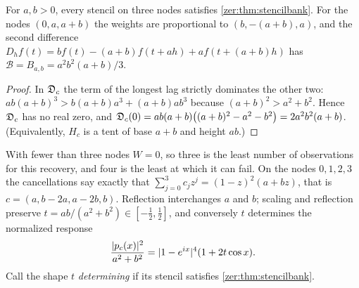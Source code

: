 \begin{corollary}\label{zer:thm:inversemeasure}
For $a,b>0$, every stencil on three nodes satisfies \cref{zer:thm:stencilbank}. For the nodes
$(0,a,a+b)$ the weights are proportional to $(b,-(a+b),a)$, and the second difference
$D_hf(t)=bf(t)-(a+b)f(t+ah)+af(t+(a+b)h)$ has
$\mathcal B=B_{a,b}=a^2b^2(a+b)/3$.
\end{corollary}
\begin{proof}
In $\mathfrak{D}_c$ the term of the longest lag strictly dominates the other two:
$ab(a+b)^3>b(a+b)a^3+(a+b)ab^3$ because $(a+b)^2>a^2+b^2$. Hence $\mathfrak{D}_c$ has no real zero, and
$\mathfrak{D}_c(0)=ab(a+b)\bigl((a+b)^2-a^2-b^2\bigr)=2a^2b^2(a+b)$. (Equivalently, $H_c$ is a tent of base $a+b$
and height $ab$.)
\end{proof}

With fewer than three nodes $W=0$, so three is the least number of observations for this recovery,
and four is the least at which it can fail. On the nodes $0,1,2,3$ the cancellations say exactly
that $\sum_{j=0}^3c_jz^j=(1-z)^2(a+bz)$, that is $c=(a,b-2a,a-2b,b)$. Reflection interchanges $a$ and
$b$; scaling and reflection preserve $t=ab/(a^2+b^2)\in[-\tfrac12,\tfrac12]$, and conversely $t$
determines the normalized response
\begin{equation}\label{zer:eq:fourresponse}
 \frac{\lvert p_c(x)\rvert^2}{a^2+b^2}=\lvert1-e^{ix}\rvert^4(1+2t\cos x).
\end{equation}
Call the shape $t$ \emph{determining} if its stencil satisfies \cref{zer:thm:stencilbank}.

